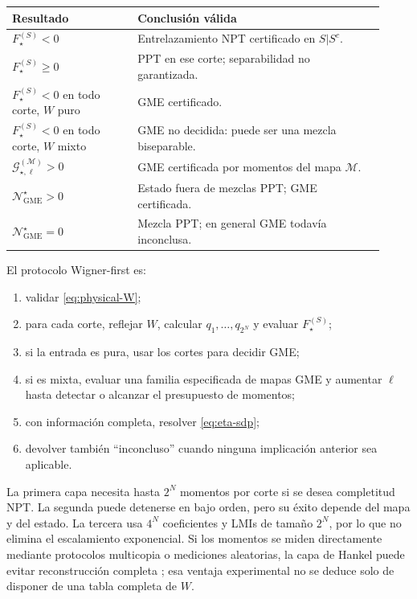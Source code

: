 \documentclass[11pt,a4paper]{article}
\newcommand{\Fstar}{F_{\star}}
\newcommand{\Ngstar}{\mathcal N_{\mathrm{GME}}^{\star}}
\theoremstyle{definition}
\begin{document}
\begin{center}
\small
\begin{tabular}{p{0.31\linewidth}p{0.61\linewidth}}
\toprule
Resultado & Conclusión válida \\
\midrule
$\Fstar^{(S)}<0$ & Entrelazamiento NPT certificado en $S|S^c$.\\
$\Fstar^{(S)}\geq0$ & PPT en ese corte; separabilidad no garantizada.\\
$\Fstar^{(S)}<0$ en todo corte, $W$ puro & GME certificado.\\
$\Fstar^{(S)}<0$ en todo corte, $W$ mixto & GME no decidida: puede ser una mezcla biseparable.\\
$\mathcal G_{\star,\ell}^{(\mathcal M)}>0$ & GME certificada por momentos del mapa $\mathcal M$.\\
$\Ngstar>0$ & Estado fuera de mezclas PPT; GME certificada.\\
$\Ngstar=0$ & Mezcla PPT; en general GME todavía inconclusa.\\
\bottomrule
\end{tabular}
\end{center}

El protocolo Wigner-first es:
\begin{enumerate}
\item validar \eqref{eq:physical-W};
\item para cada corte, reflejar $W$, calcular $q_1,\ldots,q_{2^N}$ y evaluar
$\Fstar^{(S)}$;
\item si la entrada es pura, usar los cortes para decidir GME;
\item si es mixta, evaluar una familia especificada de mapas GME y aumentar
$\ell$ hasta detectar o alcanzar el presupuesto de momentos;
\item con información completa, resolver \eqref{eq:eta-sdp};
\item devolver también ``inconcluso'' cuando ninguna implicación anterior sea
aplicable.
\end{enumerate}

La primera capa necesita hasta $2^N$ momentos por corte si se desea completitud
NPT. La segunda puede detenerse en bajo orden, pero su éxito depende del mapa y
del estado. La tercera usa $4^N$ coeficientes y LMIs de tamaño $2^N$, por lo que
no elimina el escalamiento exponencial. Si los momentos se miden directamente
mediante protocolos multicopia o mediciones aleatorias, la capa de Hankel puede
evitar reconstrucción completa \cite{Elben2020PTMoments,YuGuehne2021Hankel,
Neven2021MomentHierarchy,Mukherjee2025GMEMoments}; esa ventaja experimental no se
deduce solo de disponer de una tabla completa de $W$.
\end{document}
